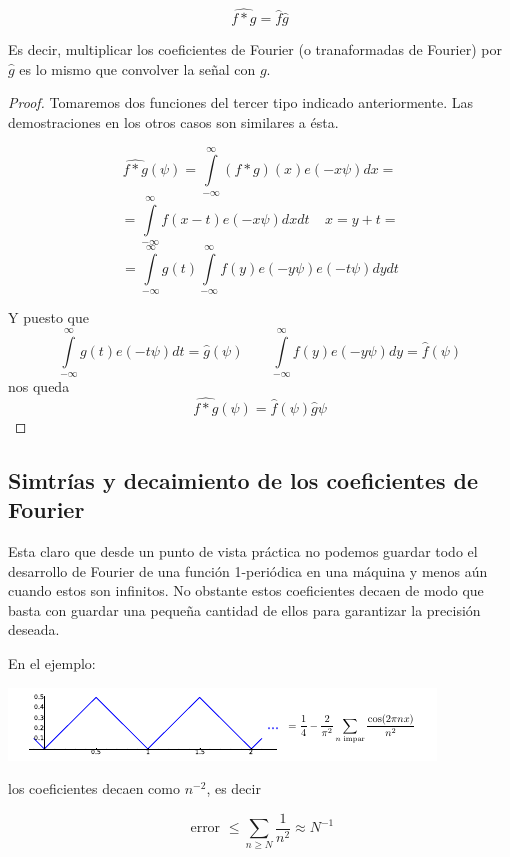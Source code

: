 \begin{prop}
	\[\widehat{f*g} = \hat{f} \hat{g}\]

	Es decir, multiplicar los coeficientes de Fourier (o tranaformadas de Fourier) por $\hat{g}$ es lo mismo que convolver la señal con $g$.

\end{prop}

\begin{proof}
Tomaremos dos funciones del tercer tipo indicado anteriormente. Las demostraciones en los otros casos son similares a ésta.

$$ \widehat{f*g}(\psi) = \int\limits^{\infty}_{-\infty} (f*g)(x) e(-x\psi)dx =$$
$$ = \int\limits^{\infty}_{-\infty} f(x - t) e (-x \psi) dx dt \;\;\;\; x = y + t=$$
$$ = \int\limits^{\infty}_{-\infty} g(t) \int\limits^{\infty}_{-\infty} f(y) e (-y \psi) e(-t\psi)dy dt$$

Y puesto que
$$ \int\limits^{\infty}_{-\infty} g(t) e(-t\psi) dt = \hat{g}(\psi) \;\;\;\;\;\;\; \int\limits^{\infty}_{-\infty} f(y) e (-y \psi) dy = \hat{f}(\psi) $$
nos queda
$$\widehat{f*g} (\psi) = \hat{f}(\psi) \hat{g}\psi $$

\end{proof}



\subsection{Simtrías y decaimiento de los coeficientes de Fourier}

Esta claro que desde un punto de vista práctica no podemos guardar todo el desarrollo de Fourier de una función 1-periódica en una máquina y menos aún cuando estos son infinitos. No obstante estos coeficientes decaen de modo que basta con guardar una pequeña cantidad de ellos para garantizar la precisión deseada.

En el ejemplo:

\begin{center}
\includegraphics[width=\linewidth]{img/ejemplo_decaimiento.png}
\end{center}

los coeficientes decaen como $n^{-2}$, es decir

\[ \text{ error } \leq \sum_{n \geq N} \frac{1}{n^2}  ≈ N^{-1} \]

